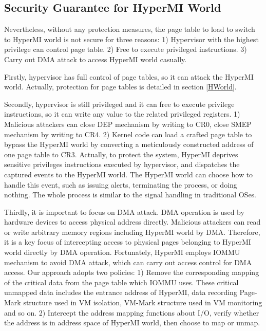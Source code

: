 \documentclass[conference]{IEEEtran}
\begin{document}
\subsection{Security Guarantee for HyperMI World}\label {SG}
Nevertheless, without any protection measures, the page table to load to switch to HyperMI world is not secure for three reasons: 1) Hypervisor with the highest privilege can control page table. 2) Free to execute privileged instructions. 3) Carry out DMA attack to access HyperMI world casually.

Firstly, hypervisor has full control of page tables, so it can attack the HyperMI world. Actually, protection for page tables is detailed in section \ref{HWorld}. 

Secondly, hypervisor is still privileged and it can free to execute privilege instructions, so it can write any value to the related privileged registers. 1) Malicious attackers can close DEP mechanism by writing to CR0, close SMEP mechanism by writing to CR4. 2) Kernel code can load a crafted page table to bypass the HyperMI world by converting a meticulously constructed address of one page table to CR3.
Actually, to protect the system, HyperMI deprives sensitive privileges instructions executed by hypervisor, and dispatches the captured events to the HyperMI world. The HyperMI world can choose how to handle this event, such as issuing alerts, terminating the process, or doing nothing. The whole process is similar to the signal handling in traditional OSes.

Thirdly, it is important to focus on DMA attack. DMA operation is used by hardware devices to access physical address directly. Malicious attackers can read or write arbitrary memory regions including HyperMI world by DMA. Therefore, it is a key focus of intercepting access to physical pages belonging to HyperMI world directly by DMA operation. 
Fortunately, HyperMI employs IOMMU mechanism to avoid DMA attack, which can carry out access control for DMA access. Our approach adopts two policies: 1) Remove the corresponding mapping of the critical data from the page table which IOMMU uses. These critical unmapped data includes the entrance address of HyperMI, data recording Page-Mark structure used in VM isolation, VM-Mark structure used in VM monitoring and so on. 2) Intercept the address mapping functions about I/O, verify whether the address is in address space of HyperMI world, then choose to map or unmap.


\end{document}
